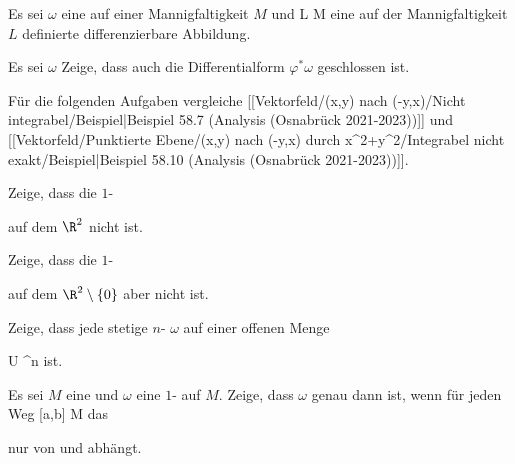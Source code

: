 {}
{

Es sei $\omega$ eine
 
auf einer Mannigfaltigkeit $M$ und
\maabb {\varphi} { L } { M
} {}
eine auf der Mannigfaltigkeit $L$ definierte differenzierbare Abbildung.

 {Es sei $\omega$
Zeige, dass auch die
Differentialform $\varphi^*\omega$ geschlossen ist.
}

}
{} {}

Für die folgenden Aufgaben vergleiche
[[Vektorfeld/(x,y) nach (-y,x)/Nicht integrabel/Beispiel|Beispiel 58.7 (Analysis (Osnabrück 2021-2023))]]
und
[[Vektorfeld/Punktierte Ebene/(x,y) nach (-y,x) durch x^2+y^2/Integrabel nicht exakt/Beispiel|Beispiel 58.10 (Analysis (Osnabrück 2021-2023))]].

{}
{

Zeige, dass die
$1$-

 {  }

auf dem $\R^2$ nicht
ist.

}
{} {}

{}
{

Zeige, dass die
$1$-

 {  }

auf dem $\R^2 \setminus \{0\}$
aber nicht
ist.

}
{} {}

{}
{

Zeige, dass jede stetige
$n$-
$\omega$ auf einer offenen Menge

\mavergleichskette
{\vergleichskette
{U
}
{ \subseteq }{\R^n
}
{  }{
}
{    }{
}
{   }{
}
}
{}{}{}
ist.

}
{} {}

{}
{

Es sei $M$ eine
und $\omega$ eine
$1$-
auf $M$. Zeige, dass $\omega$ genau dann
ist, wenn für jeden
Weg
\maabbdisp {\gamma} { [a,b] } { M
} {}
das

\mathl{\int_\gamma \omega}{} nur von
 und
 abhängt.

}
{} {}

